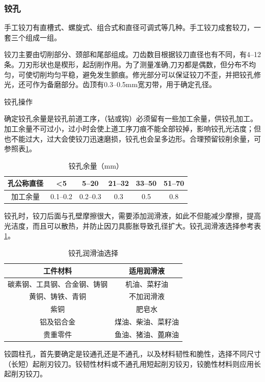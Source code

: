 \documentclass{ctexbook}
\begin{document}
\subsubsection{铰孔}
手工铰刀有直槽式、螺旋式、组合式和直径可调式等几种。手工铰刀成套较刀，一套三个组成一组。

铰刀主要由切削部分、颈部和尾部组成。刀齿数目根据铰刀直径也有不同，有4--12条。刀刃形状也是楔形，起刮削作用。为了测量准确,刀刃都是偶数，但分布不均匀，可使切削均匀平稳，避免发生颤痕。修光部分可以保证铰刀不歪，并把铰孔修光，还可作为备磨部分。齿顶有0.3--0.5mm宽刃带，用于确定孔径。

铰孔操作

确定铰孔余量是铰孔前道工序，（钻或钩）必须留有一些加工余量，供铰孔加工。加工余量不可过小，过小时会使上道工序刀痕不能全部铰掉，影响铰孔光洁度；但也不能过大，过大会使铰刀迅速磨损，铰孔也会呈多边形。合理预留铰削余量，可参照表\ref{tab:jiaokongyuliang}。

\begin{table}[htbp]
	\centering
	\caption{铰孔余量（mm）}
	\begin{tabular}{c|c|c|c|c|c}
		\hline
		孔公称直径 & <5    & 5--20& 21--32 & 33--50 & 51--70\\ \hline
		加工余量  & 0.1--0.2 & 0.2--0.3 & 0.3   & 0.5   & 0.8 \\ \hline
	\end{tabular}%
	\label{tab:jiaokongyuliang}%
\end{table}%
铰孔时，铰刀后面与孔壁摩擦很大，需要添加润滑液，如此不但能减少摩擦，提高光洁度，而且可以散热，并防止因刀具膨胀导致孔径扩大。铰孔润滑液选择参考表\ref{tab:jiaokongyuliang}。
\begin{table}[htbp]
	\centering
	\caption{铰孔润滑油选择}
	\begin{tabular}{c|c}
		\hline
		工件材料  & 适用润滑液 \\ \hline
		碳素钢、工具钢、合金钢、铸钢 & 机油、菜籽油 \\ \hline
		黄铜、铸铁、青铜 & 不加润滑液 \\ \hline
		紫铜    & 肥皂水 \\ \hline
		铝及铝合金 & 煤油、柴油、菜籽油 \\ \hline
		贵重零件  & 鱼油、猪油、蓖麻油 \\ \hline
	\end{tabular}%
	\label{tab:runhuayou}%
\end{table}%
铰圆柱孔，首先要确定是铰通孔还是不通孔，以及材料韧性和脆性，选择不同尺寸（长短）起削刃铰刀。铰韧性材料或不通孔用短起削刃铰刃，铰脆性材料则应用长起削刃铰刀。
\end{document}
